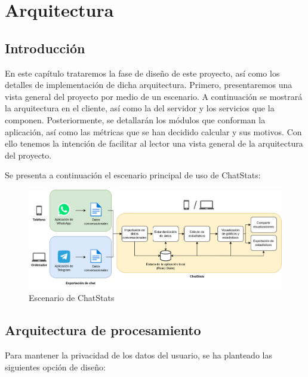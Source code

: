 \chapter{Arquitectura}
\label{chap:architecture}


\section{Introducción}
\label{sec:introduction}

En este capítulo trataremos la fase de diseño de este proyecto, así como los detalles de implementación de dicha arquitectura. Primero, presentaremos una vista general del proyecto por medio de un escenario. A continuación se mostrará la arquitectura en el cliente, así como la del servidor y los servicios que la componen. Posteriormente, se detallarán los módulos que conforman la aplicación, así como las métricas que se han decidido calcular y sus motivos. Con ello tenemos la intención de facilitar al lector una vista general de la arquitectura del proyecto.

Se presenta a continuación el escenario principal de uso de ChatStats:

\begin{figure}[H]
	\centering
	\includegraphics[width=\textwidth]{img/scenario.png}
	\caption{Escenario de ChatStats}
	\label{fig:chap4:architecture_scenario}
\end{figure}


\section{Arquitectura de procesamiento}
\label{chap:architecture:processing}




Para mantener la privacidad de los datos del usuario, se ha planteado las siguientes opción de diseño:

